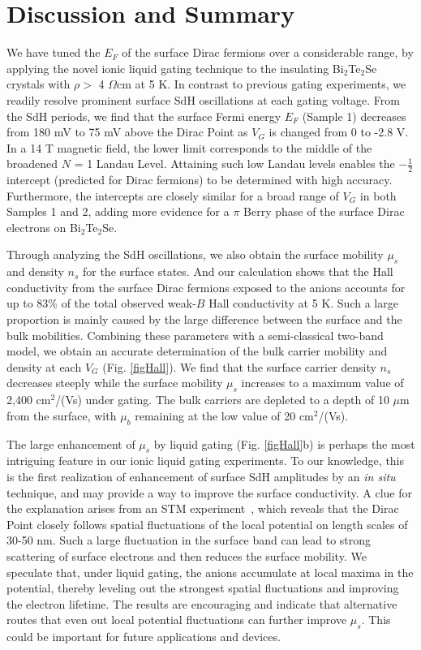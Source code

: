 \section{Discussion and Summary}
\label{sec:liquid:discussion}

We have tuned the $E_F$ of the surface Dirac fermions over a considerable range, by applying the novel ionic liquid gating technique to the insulating Bi$_2$Te$_2$Se crystals with $\rho >$ 4 $\Omega$cm at 5 K.
In contrast to previous gating experiments, we readily resolve prominent surface SdH oscillations 
at each gating voltage. From the SdH periods, we find that the surface Fermi energy $E_F$
(Sample 1) decreases  
from 180 mV to 75 mV above the Dirac Point as $V_G$ is changed from 0 to -2.8 V. 
In a 14 T magnetic field, the lower limit corresponds to
the middle of the broadened $N$ = 1 Landau Level. Attaining such low Landau levels enables the $-\frac12$
intercept (predicted for Dirac fermions) to be determined with high accuracy.
Furthermore, the intercepts are closely similar for a broad range of $V_G$ in both Samples 1 and 2, adding more evidence for a $\pi$ Berry phase of the surface Dirac electrons on Bi$_2$Te$_2$Se.

Through analyzing the SdH oscillations, we also obtain the surface mobility $\mu_s$ and density $n_s$ for the surface states. And our calculation shows that the Hall conductivity from the surface Dirac fermions exposed to the anions accounts
for up to 83$\%$ of the total observed weak-$B$ Hall conductivity at 5 K. Such a large proportion is mainly caused by the large difference between the surface and the bulk mobilities. Combining these parameters with a semi-classical two-band model, we obtain an accurate determination
of the bulk carrier mobility and density at each $V_G$ (Fig. \ref{figHall}). We find that the surface carrier density $n_s$ decreases steeply while the surface mobility
$\mu_s$ increases to a maximum value of 2,400 cm$^2$/(Vs) under gating. The bulk carriers are depleted to a depth of 10 $\mu$m from the 
surface, with $\mu_b$ remaining at the low value of 20 cm$^2$/(Vs).



The large enhancement of $\mu_s$
by liquid gating (Fig. \ref{figHall}b) is perhaps the most intriguing 
feature in our ionic liquid gating experiments. To our knowledge, this is the first realization of 
enhancement of surface SdH amplitudes by an \emph{in situ} technique, and may provide a way to improve the surface conductivity. A clue for the explanation arises from an STM experiment~\cite{Beidenkopf2011}, which reveals that
the Dirac Point closely follows spatial fluctuations of the local
potential on length scales of 30-50 nm. Such a large fluctuation in the surface band can lead to strong scattering
of surface electrons and then reduces the surface mobility. We speculate that, under liquid gating, the anions accumulate
at local maxima in the potential, thereby leveling out the strongest spatial fluctuations and improving the electron lifetime.
The results are encouraging and indicate that alternative routes that even out local
potential fluctuations can further improve $\mu_s$. This could be important for future applications and devices.

